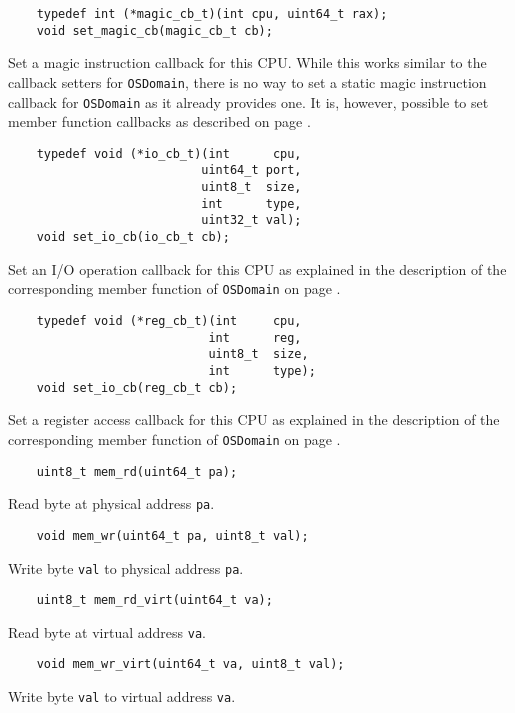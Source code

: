 \documentclass[letterpaper, 10pt]{book}
\begin{document}
\begin{verbatim}
    typedef int (*magic_cb_t)(int cpu, uint64_t rax);
    void set_magic_cb(magic_cb_t cb);
\end{verbatim}
Set a magic instruction callback for this CPU. While this works similar to the
callback setters for \texttt{OSDomain}, there is no way to set a static magic
instruction callback for \texttt{OSDomain} as it already provides one. It is,
however, possible to set member function callbacks as described on page
\pageref{tf:set_magic_cb}.

\begin{verbatim}
    typedef void (*io_cb_t)(int      cpu, 
                           uint64_t port, 
                           uint8_t  size, 
                           int      type, 
                           uint32_t val);
    void set_io_cb(io_cb_t cb);
\end{verbatim}
Set an I/O operation callback for this CPU as explained in the 
description of the corresponding member function of \texttt{OSDomain} on page
\pageref{func:set_io_cb}.

\begin{verbatim}                                                               
    typedef void (*reg_cb_t)(int     cpu,
                            int      reg,
                            uint8_t  size,
                            int      type);
    void set_io_cb(reg_cb_t cb); 
\end{verbatim}
Set a register access callback for this CPU as explained in the description of
the corresponding member function of \texttt{OSDomain} on page
\pageref{func:set_reg_cb}.


\begin{verbatim}
    uint8_t mem_rd(uint64_t pa);
\end{verbatim}
Read byte at physical address \texttt{pa}.

\begin{verbatim}
    void mem_wr(uint64_t pa, uint8_t val);
\end{verbatim}
Write byte \texttt{val} to physical address \texttt{pa}.

\begin{verbatim}
    uint8_t mem_rd_virt(uint64_t va);
\end{verbatim}
Read byte at virtual address \texttt{va}.

\begin{verbatim}
    void mem_wr_virt(uint64_t va, uint8_t val);
\end{verbatim}
Write byte \texttt{val} to virtual address \texttt{va}.
\end{document}
